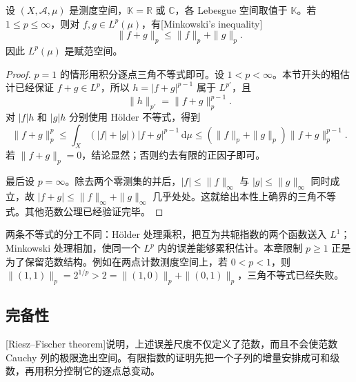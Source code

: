 \begin{theorem}[Minkowski]\label{b1:thm:lp-minkowski}
设 \((X,\mathcal A,\mu)\) 是测度空间，\(\mathbb K=\mathbb R\) 或 \(\mathbb C\)，各 Lebesgue 空间取值于 \(\mathbb K\)。若 \(1\leq p\leq\infty\)，则对 \(f,g\in L^p(\mu)\)，有[Minkowski's inequality]
\[
 \|f+g\|_p\leq\|f\|_p+\|g\|_p.
\]
因此 \(L^p(\mu)\) 是赋范空间。
\end{theorem}
\begin{proof}
\(p=1\) 的情形用积分逐点三角不等式即可。设 \(1<p<\infty\)。本节开头的粗估计已经保证 \(f+g\in L^p\)，所以 \(h=|f+g|^{p-1}\) 属于 \(L^{p'}\)，且
\[
 \|h\|_{p'}=\|f+g\|_p^{p-1}.
\]
对 \(|f|h\) 和 \(|g|h\) 分别使用 Hölder 不等式，得到
\[
 \|f+g\|_p^p
 \leq\int_X(|f|+|g|)|f+g|^{p-1}\,\mathrm d\mu
 \leq(\|f\|_p+\|g\|_p)\|f+g\|_p^{p-1}.
\]
若 \(\|f+g\|_p=0\)，结论显然；否则约去有限的正因子即可。

最后设 \(p=\infty\)。除去两个零测集的并后，\(|f|\leq\|f\|_\infty\) 与 \(|g|\leq\|g\|_\infty\) 同时成立，故 \(|f+g|\leq\|f\|_\infty+\|g\|_\infty\) 几乎处处。这就给出本性上确界的三角不等式。其他范数公理已经验证完毕。
\end{proof}

两条不等式的分工不同：Hölder 处理乘积，把互为共轭指数的两个函数送入 \(L^1\)；Minkowski 处理相加，使同一个 \(L^p\) 内的误差能够累积估计。本章限制 \(p\geq1\) 正是为了保留范数结构。例如在两点计数测度空间上，若 \(0<p<1\)，则 \(\|(1,1)\|_p=2^{1/p}>2=\|(1,0)\|_p+\|(0,1)\|_p\)，三角不等式已经失败。

\subsection{完备性}
\label{b1:subsec:100105}

[Riesz--Fischer theorem]说明，上述误差尺度不仅定义了范数，而且不会使范数 Cauchy 列的极限逸出空间。有限指数的证明先把一个子列的增量安排成可和级数，再用积分控制它的逐点总变动。

